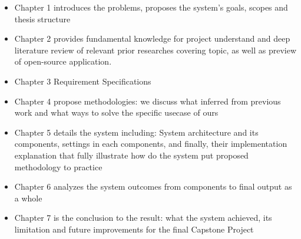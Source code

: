 \begin{itemize}
    \item {Chapter 1} introduces the problems, proposes the system's goals, scopes and thesis structure
    \item {Chapter 2} provides fundamental knowledge for project understand and deep literature review of relevant prior researches covering topic, as well as preview of open-source application.
    \item {Chapter 3} Requirement Specifications
    \item {Chapter 4} propose methodologies: we discuss what inferred from previous work and what ways to solve the specific usecase of ours
    \item {Chapter 5} details the system including: System architecture and its components, settings in each components, and finally, their implementation explanation that fully illustrate how do the system put proposed methodology to practice 
    \item {Chapter 6} analyzes the system outcomes from components to final output as a whole
    \item {Chapter 7} is the conclusion to the result: what the system achieved, its limitation and future improvements for the final Capstone Project
\end{itemize}
